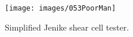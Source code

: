 \begin{figure}[!htb]
\centering
\texttt{[image: images/053PoorMan]}
\caption[SJSCT]{Simplified Jenike shear cell tester.}
\label{fig:053PoorMan}
\end{figure}